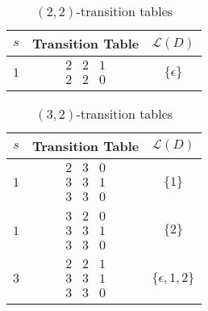 \documentclass[10pt,a4paper,notitlepage]{article}
\begin{document}
\begin{table}[H]
\centering
\begin{tabular}{|c|c|c|}\hline
$s$ & Transition Table & $\mathcal{L}(D)$ \\
\hline
$1$ & $\begin{array}{ccc} 2 & 2 & 1\\ 2 & 2 & 0 \end{array}$ & $\lbrace \epsilon \rbrace$\\ \hline
\end{tabular}
\caption{$(2,2)$-transition tables}
\end{table}

\begin{table}[H]
\centering
\begin{tabular}{|c|c|c|} \hline
$s$ & Transition Table & $\mathcal{L}(D)$ \\
\hline
$1$ & $\begin{array}{ccc} 2 & 3 & 0\\ 3 & 3 & 1\\ 3 & 3 & 0 \end{array}$ & $\lbrace 1 \rbrace$\\ \hline 
$1$ & $\begin{array}{ccc} 3 & 2 & 0\\ 3 & 3 & 1\\ 3 & 3 & 0 \end{array}$ & $\lbrace 2 \rbrace$\\ \hline
$3$ & $\begin{array}{ccc} 2 & 2 & 1\\ 3 & 3 & 1\\ 3 & 3 & 0 \end{array}$ & $\lbrace \epsilon, 1 ,2\rbrace$\\ \hline
\end{tabular}
\caption{$(3,2)$-transition tables}
\end{table}
\end{document}
